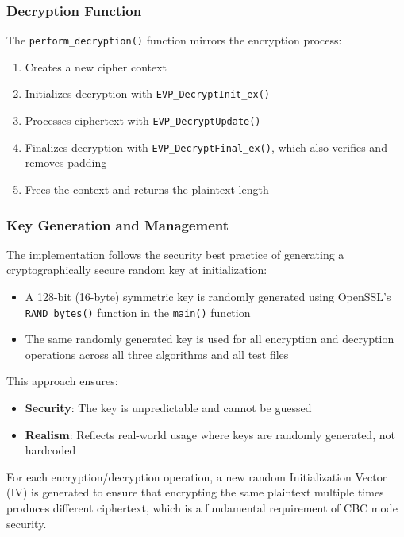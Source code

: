 \documentclass[12pt,a4paper]{article}
\begin{document}
\subsubsection{Decryption Function}
The \texttt{perform\_decryption()} function mirrors the encryption process:
\begin{enumerate}
    \item Creates a new cipher context
    \item Initializes decryption with \texttt{EVP\_DecryptInit\_ex()}
    \item Processes ciphertext with \texttt{EVP\_DecryptUpdate()}
    \item Finalizes decryption with \texttt{EVP\_DecryptFinal\_ex()}, which also verifies and removes padding
    \item Frees the context and returns the plaintext length
\end{enumerate}

\subsubsection{Key Generation and Management}
The implementation follows the security best practice of generating a cryptographically secure random key at initialization:

\begin{itemize}
    \item A 128-bit (16-byte) symmetric key is randomly generated using OpenSSL's \texttt{RAND\_bytes()} function in the \texttt{main()} function
    \item The same randomly generated key is used for all encryption and decryption operations across all three algorithms and all test files
\end{itemize}

This approach ensures:
\begin{itemize}
    \item \textbf{Security}: The key is unpredictable and cannot be guessed
    \item \textbf{Realism}: Reflects real-world usage where keys are randomly generated, not hardcoded
\end{itemize}

For each encryption/decryption operation, a new random Initialization Vector (IV) is generated to ensure that encrypting the same plaintext multiple times produces different ciphertext, which is a fundamental requirement of CBC mode security.
\end{document}
